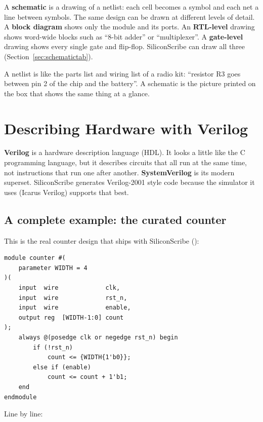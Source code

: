 A \textbf{schematic} is a drawing of a netlist: each cell becomes a symbol and each net a line between symbols. The same design can be drawn at different levels of detail. A \textbf{block diagram} shows only the module and its ports. An \textbf{RTL-level} drawing shows word-wide blocks such as ``8-bit adder'' or ``multiplexer''. A \textbf{gate-level} drawing shows every single gate and flip-flop. SiliconScribe can draw all three (Section~\ref{sec:schematictab}).

\begin{analogy}
A netlist is like the parts list and wiring list of a radio kit: ``resistor R3 goes between pin 2 of the chip and the battery''. A schematic is the picture printed on the box that shows the same thing at a glance.
\end{analogy}

\chapter{Describing Hardware with Verilog}
\label{ch:verilog}

\textbf{Verilog} is a hardware description language (HDL). It looks a little like the C programming language, but it describes circuits that all run at the same time, not instructions that run one after another. \textbf{SystemVerilog} is its modern superset. SiliconScribe generates Verilog-2001 style code because the simulator it uses (Icarus Verilog) supports that best.

\section{A complete example: the curated counter}
\label{sec:counterexample}

This is the real counter design that ships with SiliconScribe ():

\begin{lstlisting}
module counter #(
    parameter WIDTH = 4
)(
    input  wire             clk,
    input  wire             rst_n,
    input  wire             enable,
    output reg  [WIDTH-1:0] count
);
    always @(posedge clk or negedge rst_n) begin
        if (!rst_n)
            count <= {WIDTH{1'b0}};
        else if (enable)
            count <= count + 1'b1;
    end
endmodule
\end{lstlisting}

Line by line:

